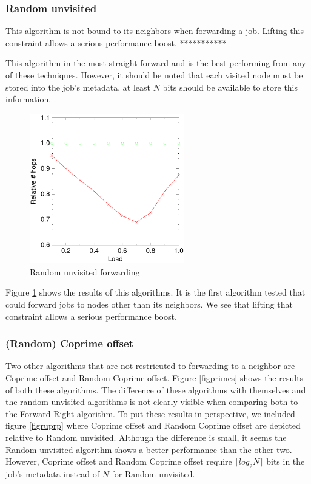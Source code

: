 \documentclass[10pt,a4paper]{article}
\begin{document}
\subsubsection*{Random unvisited}
This algorithm is not bound to its neighbors when forwarding a job. Lifting this constraint allows a serious performance boost. ***********

This algorithm in the most straight forward and is the best performing from any of these techniques. However, it should be noted that each visited node must be stored into the job's metadata, at least $N$ bits should be available to store this information.

\begin{figure}[h!tb]
\centering
\includegraphics[width=0.6\textwidth]{data/randunvisitedright.pdf}
\caption{Random unvisited forwarding}
\label{figrandunvisited}
\end{figure}

Figure \ref{figrandunvisited} shows the results of this algorithms. It is the first algorithm tested that could forward jobs to nodes other than its neighbors. We see that lifting that constraint allows a serious performance boost.

\subsubsection*{(Random) Coprime offset}
Two other algorithms that are not restricuted to forwarding to a neighbor are Coprime offset and Random Coprime offset. Figure \ref{figprimes} shows the results of both these algorithms. The difference of these algorithms with themselves and the random unvisited algorithms is not clearly visible when comparing both to the Forward Right algorithm. To put these results in perspective, we included figure \ref{figruprp} where Coprime offset and Random Coprime offset are depicted relative to Random unvisited. Although the difference is small, it seems the Random unvisited algorithm shows a better performance than the other two. However, Coprime offset and Random Coprime offset require $\lceil log_2 N \rceil$ bits in the job's metadata instead of $N$ for Random unvisited.
\end{document}
